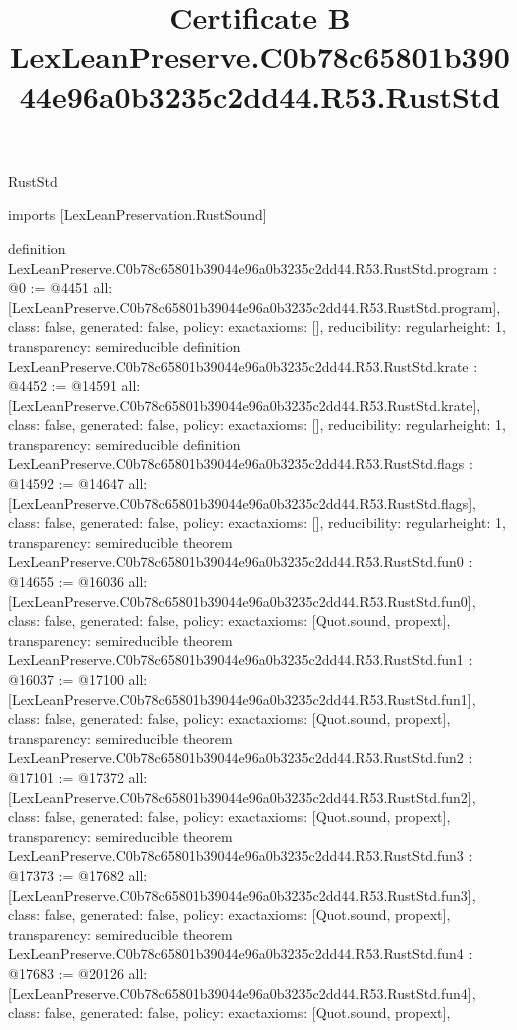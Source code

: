 \begin{lexlean}{RustStd}
\title{Certificate B LexLeanPreserve.C0b78c65801b39044e96a0b3235c2dd44.R53.RustStd}
\begin{coremodule}
imports [LexLeanPreservation.RustSound]

definition LexLeanPreserve.C0b78c65801b39044e96a0b3235c2dd44.R53.RustStd.program : @0 := @4451 {
  all: [LexLeanPreserve.C0b78c65801b39044e96a0b3235c2dd44.R53.RustStd.program],
  class: false,
  generated: false,
  policy: exact{axioms: []},
  reducibility: regular{height: 1},
  transparency: semireducible
}
definition LexLeanPreserve.C0b78c65801b39044e96a0b3235c2dd44.R53.RustStd.krate : @4452 := @14591 {
  all: [LexLeanPreserve.C0b78c65801b39044e96a0b3235c2dd44.R53.RustStd.krate],
  class: false,
  generated: false,
  policy: exact{axioms: []},
  reducibility: regular{height: 1},
  transparency: semireducible
}
definition LexLeanPreserve.C0b78c65801b39044e96a0b3235c2dd44.R53.RustStd.flags : @14592 := @14647 {
  all: [LexLeanPreserve.C0b78c65801b39044e96a0b3235c2dd44.R53.RustStd.flags],
  class: false,
  generated: false,
  policy: exact{axioms: []},
  reducibility: regular{height: 1},
  transparency: semireducible
}
theorem LexLeanPreserve.C0b78c65801b39044e96a0b3235c2dd44.R53.RustStd.fun0 : @14655 := @16036 {
  all: [LexLeanPreserve.C0b78c65801b39044e96a0b3235c2dd44.R53.RustStd.fun0],
  class: false,
  generated: false,
  policy: exact{axioms: [Quot.sound, propext]},
  transparency: semireducible
}
theorem LexLeanPreserve.C0b78c65801b39044e96a0b3235c2dd44.R53.RustStd.fun1 : @16037 := @17100 {
  all: [LexLeanPreserve.C0b78c65801b39044e96a0b3235c2dd44.R53.RustStd.fun1],
  class: false,
  generated: false,
  policy: exact{axioms: [Quot.sound, propext]},
  transparency: semireducible
}
theorem LexLeanPreserve.C0b78c65801b39044e96a0b3235c2dd44.R53.RustStd.fun2 : @17101 := @17372 {
  all: [LexLeanPreserve.C0b78c65801b39044e96a0b3235c2dd44.R53.RustStd.fun2],
  class: false,
  generated: false,
  policy: exact{axioms: [Quot.sound, propext]},
  transparency: semireducible
}
theorem LexLeanPreserve.C0b78c65801b39044e96a0b3235c2dd44.R53.RustStd.fun3 : @17373 := @17682 {
  all: [LexLeanPreserve.C0b78c65801b39044e96a0b3235c2dd44.R53.RustStd.fun3],
  class: false,
  generated: false,
  policy: exact{axioms: [Quot.sound, propext]},
  transparency: semireducible
}
theorem LexLeanPreserve.C0b78c65801b39044e96a0b3235c2dd44.R53.RustStd.fun4 : @17683 := @20126 {
  all: [LexLeanPreserve.C0b78c65801b39044e96a0b3235c2dd44.R53.RustStd.fun4],
  class: false,
  generated: false,
  policy: exact{axioms: [Quot.sound, propext]},
}
\end{coremodule}
\end{lexlean}
